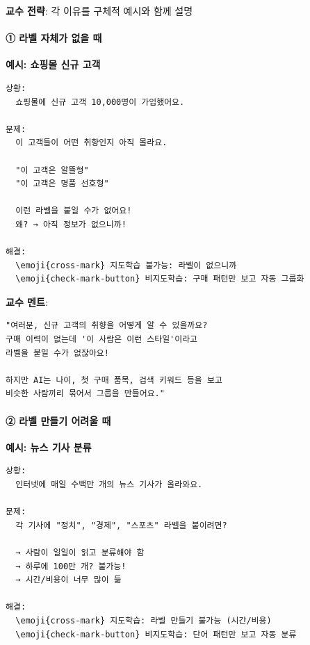 \documentclass[a4paper, 11pt]{article}
\begin{document}
\textbf{교수 전략}: 각 이유를 구체적 예시와 함께 설명

\hypertarget{uxb77cuxbca8-uxc790uxccb4uxac00-uxc5c6uxc744-uxb54c}{%
\paragraph{\textbf{①} 라벨 자체가 없을
때}\label{uxb77cuxbca8-uxc790uxccb4uxac00-uxc5c6uxc744-uxb54c}}

\textbf{예시: 쇼핑몰 신규 고객}

\begin{verbatim}
상황:
  쇼핑몰에 신규 고객 10,000명이 가입했어요.

문제:
  이 고객들이 어떤 취향인지 아직 몰라요.
  
  "이 고객은 알뜰형"
  "이 고객은 명품 선호형"
  
  이런 라벨을 붙일 수가 없어요!
  왜? → 아직 정보가 없으니까!

해결:
  \emoji{cross-mark} 지도학습 불가능: 라벨이 없으니까
  \emoji{check-mark-button} 비지도학습: 구매 패턴만 보고 자동 그룹화
\end{verbatim}

\textbf{교수 멘트}:

\begin{verbatim}
"여러분, 신규 고객의 취향을 어떻게 알 수 있을까요?
구매 이력이 없는데 '이 사람은 이런 스타일'이라고
라벨을 붙일 수가 없잖아요!

하지만 AI는 나이, 첫 구매 품목, 검색 키워드 등을 보고
비슷한 사람끼리 묶어서 그룹을 만들어요."
\end{verbatim}

\hypertarget{uxb77cuxbca8-uxb9ccuxb4e4uxae30-uxc5b4uxb824uxc6b8-uxb54c}{%
\paragraph{\textbf{②} 라벨 만들기 어려울
때}\label{uxb77cuxbca8-uxb9ccuxb4e4uxae30-uxc5b4uxb824uxc6b8-uxb54c}}

\textbf{예시: 뉴스 기사 분류}

\begin{verbatim}
상황:
  인터넷에 매일 수백만 개의 뉴스 기사가 올라와요.

문제:
  각 기사에 "정치", "경제", "스포츠" 라벨을 붙이려면?
  
  → 사람이 일일이 읽고 분류해야 함
  → 하루에 100만 개? 불가능!
  → 시간/비용이 너무 많이 듦

해결:
  \emoji{cross-mark} 지도학습: 라벨 만들기 불가능 (시간/비용)
  \emoji{check-mark-button} 비지도학습: 단어 패턴만 보고 자동 분류
\end{verbatim}
\end{document}
